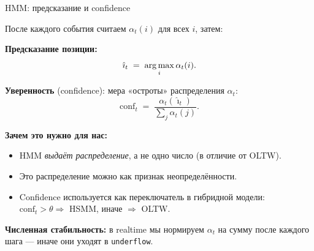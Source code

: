 \begin{frame}{HMM: предсказание и confidence}

После каждого события считаем $\alpha_t(i)$ для всех $i$, затем:

\bigskip

\textbf{Предсказание позиции:}
\[
\hat\imath_t \;=\; \operatorname*{arg\,max}_{i} \alpha_t(i).
\]

\bigskip

\textbf{Уверенность} (confidence): мера «остроты» распределения
$\alpha_t$:
\[
\mathrm{conf}_t \;=\; \frac{\alpha_t(\hat\imath_t)}{\sum_j \alpha_t(j)}.
\]

\bigskip

\textbf{Зачем это нужно для нас:}
\begin{itemize}
\item HMM \emph{выдаёт распределение}, а не одно число (в отличие от OLTW).
\item Это распределение можно  как
      признак неопределённости.
\item Confidence используется как переключатель в гибридной модели:
      $\mathrm{conf}_t > \theta \Rightarrow$ HSMM,
      иначе $\Rightarrow$ OLTW.
\end{itemize}

\bigskip

\textbf{Численная стабильность:} в realtime мы нормируем $\alpha_t$ на
сумму после каждого шага --- иначе они уходят в \texttt{underflow}.

\end{frame}
